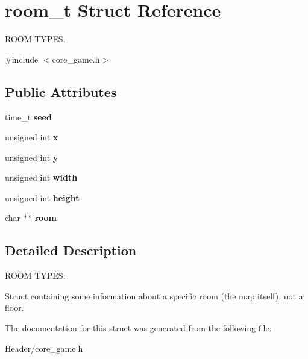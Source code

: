 \hypertarget{structroom__t}{}\section{room\+\_\+t Struct Reference}
\label{structroom__t}


R\+O\+OM T\+Y\+P\+ES.  




{\ttfamily \#include $<$core\+\_\+game.\+h$>$}

\subsection*{Public Attributes}
\begin{DoxyCompactItemize}
\item 
\mbox{\label{structroom__t_adb7c30dc6f6ce65a183617cfb6103153}} 
time\+\_\+t {\bfseries seed}
\item 
\mbox{\label{structroom__t_aa31ec0a55624a0c3f4e01f7be20ff9b0}} 
unsigned int {\bfseries x}
\item 
\mbox{\label{structroom__t_a2bbf5954c941e17430d9b2e2ed22e264}} 
unsigned int {\bfseries y}
\item 
\mbox{\label{structroom__t_a47c6a27b43b3544a7d4526650fe1e6b6}} 
unsigned int {\bfseries width}
\item 
\mbox{\label{structroom__t_ab2d5fdfda5e67b955d8654802fb8de22}} 
unsigned int {\bfseries height}
\item 
\mbox{\label{structroom__t_af5dc160ee108a44b9170755963f92922}} 
char $\ast$$\ast$ {\bfseries room}
\end{DoxyCompactItemize}


\subsection{Detailed Description}
R\+O\+OM T\+Y\+P\+ES. 

Struct containing some information about a specific room (the map itself), not a floor. 

The documentation for this struct was generated from the following file\+:\begin{DoxyCompactItemize}
\item 
Header/core\+\_\+game.\+h\end{DoxyCompactItemize}
